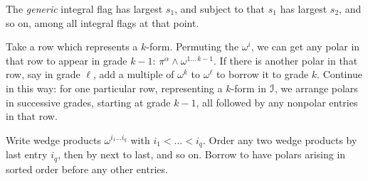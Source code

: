The \emph{generic} integral flag has largest \(s_1\), and subject to that \(s_1\) has largest \(s_2\), and so on, among all integral flags at that point.

Take a row which represents a \(k\)-form.
Permuting the \(\omega^i\), we can get any polar in that row to appear in grade \(k-1\): \(\pi^{\alpha}\wedge\omega^{1\dots \, k-1}\).
If there is another polar in that row, say in grade \(\ell\), add a multiple of \(\omega^k\) to \(\omega^{\ell}\) to borrow it to grade \(k\).
Continue in this way: for one particular row, representing a \(k\)-form in \(\mathcal{I}\), we arrange polars in successive grades, starting at grade \(k-1\), all followed by any nonpolar entries in that row.

Write wedge products \(\omega^{i_1\dots i_q}\) with \(i_1<\dots<i_q\).
Order any two wedge products by last entry \(i_q\), then by next to last, and so on.
Borrow to have polars arising in sorted order before any other entries.

